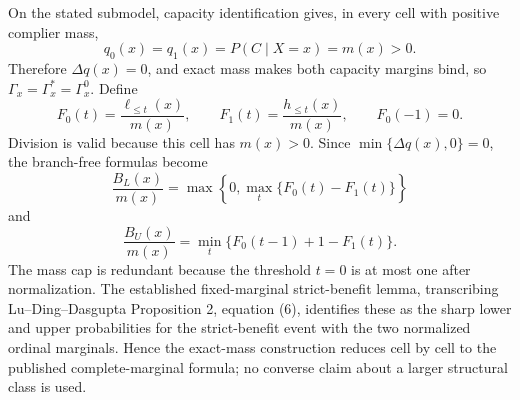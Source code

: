 On the stated submodel, capacity identification gives, in every cell with positive complier mass,
\[
q_0(x)=q_1(x)=P(C\mid X=x)=m(x)>0.
\]
Therefore \(\Delta q(x)=0\), and exact mass makes both capacity margins bind, so \(\Gamma_x=\Gamma_x^{\ast}=\Gamma_x^0\).  Define
\[
F_0(t)=\frac{\ell_{\le t}(x)}{m(x)},\qquad F_1(t)=\frac{h_{\le t}(x)}{m(x)},\qquad F_0(-1)=0.
\]
Division is valid because this cell has \(m(x)>0\).  Since \(\min\{\Delta q(x),0\}=0\), the branch-free formulas become
\[
\frac{B_L(x)}{m(x)}=\max\left\{0,\max_t\{F_0(t)-F_1(t)\}\right\}
\]
and
\[
\frac{B_U(x)}{m(x)}=\min_t\{F_0(t-1)+1-F_1(t)\}.
\]
The mass cap is redundant because the threshold \(t=0\) is at most one after normalization.  The established fixed-marginal strict-benefit lemma, transcribing Lu--Ding--Dasgupta Proposition 2, equation (6), identifies these as the sharp lower and upper probabilities for the strict-benefit event with the two normalized ordinal marginals.  Hence the exact-mass construction reduces cell by cell to the published complete-marginal formula; no converse claim about a larger structural class is used.